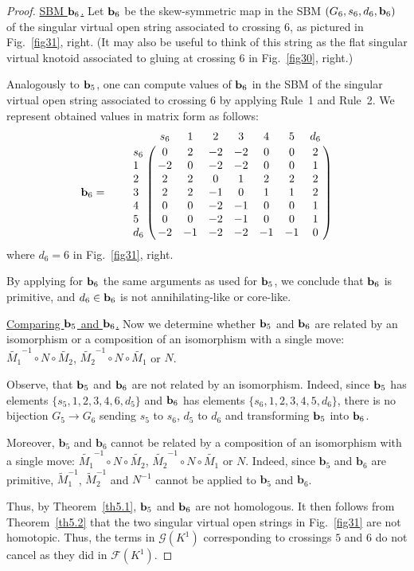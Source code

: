 \documentclass[11pt]{amsart}
\theoremstyle{noparens}
\numberwithin{equation}{section}
\numberwithin{equation}{section}
\begin{document}
\begin{proof}
\underline{SBM ${\bf b}_6$.}
Let ${\bf b}_6$ be the skew-symmetric map in the SBM $(G_6, s_6, d_6, {\bf b}_6)$ of the singular virtual open string associated to crossing $6$, as pictured in Fig.~\ref{fig31}, right. (It may also be useful to think of this string as the flat singular virtual knotoid associated to gluing at crossing $6$ in Fig.~\ref{fig30}, right.)

Analogously to ${\bf b}_5$, one can compute values of ${\bf b}_6$ in the SBM of the singular virtual open string associated to crossing $6$ by applying Rule~1 and Rule~2. We represent obtained values in matrix form as follows:
$$ 
{\bf b}_6 = \qquad \bordermatrix{
	& s_6 & 1 &  2 & 3 & 4 & 5 & d_6  \cr
	s_6   & 0 &  2 &-2 &-2 & 0 & 0 & 2\cr
	1   &-2 &  0 &-2 &-2 & 0 & 0 & 1\cr
	2   & 2 &  2 & 0 & 1 & 2 & 2 & 2\cr
	3   & 2 &  2 &-1 & 0 & 1 & 1 & 2\cr
	4   & 0 &  0 &-2 &-1 & 0 & 0 & 1\cr
	5   & 0 &  0 &-2 &-1 & 0 & 0 & 1\cr 
	d_6   &-2 & -1 &-2 &-2 &-1 &-1 & 0\cr 
}
$$ 
where $d_6=6$ in Fig.~\ref{fig31}, right.

By applying for ${\bf b}_6$ the same arguments as used for ${\bf b}_5$, we conclude that ${\bf b}_6$ is primitive, and $d_6 \in {\bf b}_6$ is not annihilating-like or core-like.

\underline{Comparing ${\bf b}_5$ and ${\bf b}_6$.}
Now we determine  whether ${\bf b}_5 $ and ${\bf b}_6 $ are related by an isomorphism or a composition of an isomorphism with a single move: $\widetilde{M_1}^{-1} \circ N \circ \widetilde{M_2}$, $\widetilde{M_2}^{-1} \circ N \circ \widetilde{M_1}$ or $N$.

Observe, that ${\bf b}_5 $ and ${\bf b}_6 $ are not related by an isomorphism. Indeed,  since 
${\bf b}_5 $ has elements $ \{s_5, 1, 2, 3, 4, 6, d_5\}$ and ${\bf b}_6$ has elements $ \{s_6, 1, 2, 3, 4, 5, d_6\} $, there is no bijection $G_5 \to G_6$ sending $s_5$ to $s_6$, $d_5$ to $d_6$ and transforming ${\bf b}_5$ into ${\bf b}_6$.

Moreover, $ \mathbf{b}_5 $ and $ \mathbf{b}_6 $ cannot be related by a composition of an isomorphism with a single move: $\widetilde{M_1}^{-1} \circ N \circ \widetilde{M_2}$, $\widetilde{M_2}^{-1} \circ N \circ \widetilde{M_1}$ or $N$. Indeed, since $\mathbf{b}_5$ and $\mathbf{b}_6$ are primitive,  $\widetilde{M}_1^{-1}$, $\widetilde{M}_2^{-1}$ and $N^{-1}$ cannot be applied to $\mathbf{b}_5$ and $\mathbf{b}_6$.

Thus, by Theorem~\ref{th5.1}, ${\bf b}_5$ and ${\bf b}_6$ are not homologous. It then follows from Theorem~\ref{th5.2} that the two singular virtual open strings in Fig.~\ref{fig31} are not homotopic. Thus, the terms in $\mathcal{G}(K^1)$ corresponding to crossings $5$ and $6$ do not cancel as they did in $\mathcal{F}(K^1)$.


\end{proof}
\end{document}

